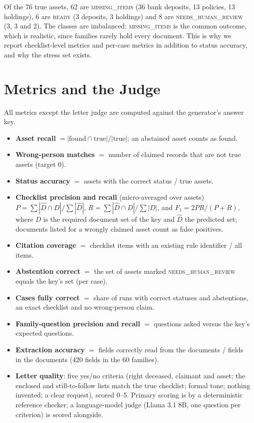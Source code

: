 \documentclass[12pt,a4paper,oneside]{report}
\begin{document}
Of the 76 true assets, 62 are \textsc{missing\_items} (36 bank deposits, 13 policies, 13 holdings), 6 are \textsc{ready} (3 deposits, 3 holdings) and 8 are \textsc{needs\_human\_review} (3, 3 and 2). The classes are imbalanced: \textsc{missing\_items} is the common outcome, which is realistic, since families rarely hold every document. This is why we report checklist-level metrics and per-case metrics in addition to status accuracy, and why the stress set exists.

\section{Metrics and the Judge}\label{sec:judge}
All metrics except the letter judge are computed against the generator's answer key.

\begin{itemize}[leftmargin=*,itemsep=2pt]
\item \textbf{Asset recall} $=|\text{found}\cap\text{true}|/|\text{true}|$; an abstained asset counts as found.
\item \textbf{Wrong-person matches} $=$ number of claimed records that are not true assets (target 0).
\item \textbf{Status accuracy} $=$ assets with the correct status / true assets.
\item \textbf{Checklist precision and recall} (micro-averaged over assets) $P=\sum|\hat D\cap D|/\sum|\hat D|$, $R=\sum|\hat D\cap D|/\sum|D|$, and $F_1=2PR/(P+R)$, where $D$ is the required document set of the key and $\hat D$ the predicted set; documents listed for a wrongly claimed asset count as false positives.
\item \textbf{Citation coverage} $=$ checklist items with an existing rule identifier / all items.
\item \textbf{Abstention correct} $=$ the set of assets marked \textsc{needs\_human\_review} equals the key's set (per case).
\item \textbf{Cases fully correct} $=$ share of runs with correct statuses and abstentions, an exact checklist and no wrong-person claim.
\item \textbf{Family-question precision and recall} $=$ questions asked versus the key's expected questions.
\item \textbf{Extraction accuracy} $=$ fields correctly read from the documents / fields in the documents (420 fields in the 60 families).
\item \textbf{Letter quality}: five yes/no criteria (right deceased, claimant and asset; the enclosed and still-to-follow lists match the true checklist; formal tone; nothing invented; a clear request), scored 0--5. Primary scoring is by a deterministic reference checker; a language-model judge (Llama 3.1 8B, one question per criterion) is scored alongside.
\end{itemize}
\end{document}
